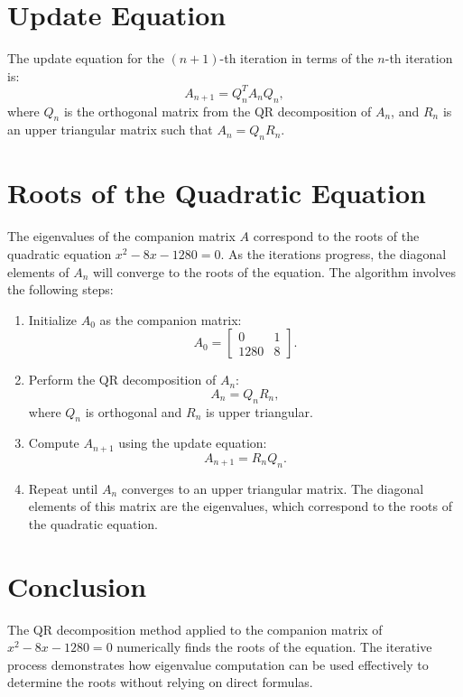 \documentclass[journal]{IEEEtran}
\begin{document}
\section*{Update Equation}
The update equation for the \((n+1)\)-th iteration in terms of the \(n\)-th iteration is:
\[
A_{n+1} = Q_n^T A_n Q_n,
\]
where \( Q_n \) is the orthogonal matrix from the QR decomposition of \( A_n \), and \( R_n \) is an upper triangular matrix such that \( A_n = Q_n R_n \).

\section*{Roots of the Quadratic Equation}
The eigenvalues of the companion matrix \( A \) correspond to the roots of the quadratic equation \( x^2 - 8x - 1280 = 0 \). As the iterations progress, the diagonal elements of \( A_n \) will converge to the roots of the equation. The algorithm involves the following steps:
\begin{enumerate}
    \item Initialize \( A_0 \) as the companion matrix:
    \[
    A_0 = \begin{bmatrix}
    0 & 1 \\
    1280 & 8
    \end{bmatrix}.
    \]
    \item Perform the QR decomposition of \( A_n \):
    \[
    A_n = Q_n R_n,
    \]
    where \( Q_n \) is orthogonal and \( R_n \) is upper triangular.
    \item Compute \( A_{n+1} \) using the update equation:
    \[
    A_{n+1} = R_n Q_n.
    \]
    \item Repeat until \( A_n \) converges to an upper triangular matrix. The diagonal elements of this matrix are the eigenvalues, which correspond to the roots of the quadratic equation.
\end{enumerate}

\section*{Conclusion}
The QR decomposition method applied to the companion matrix of \( x^2 - 8x - 1280 = 0 \) numerically finds the roots of the equation. The iterative process demonstrates how eigenvalue computation can be used effectively to determine the roots without relying on direct formulas.
\end{document}
